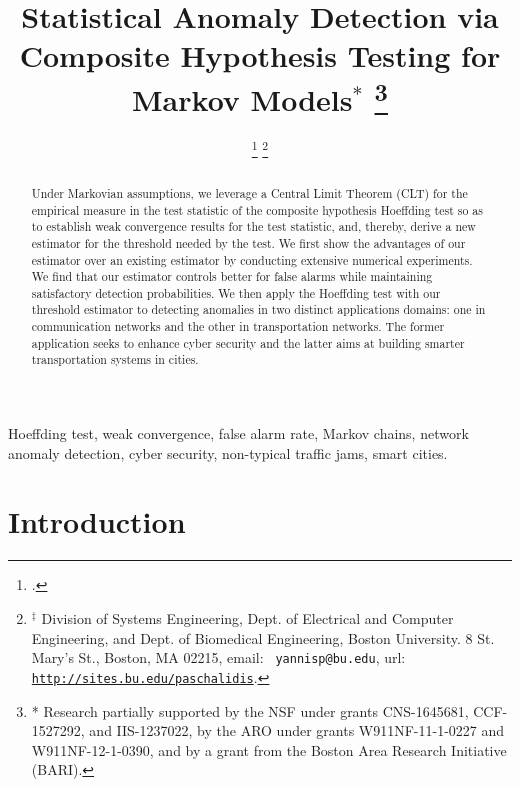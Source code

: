 \documentclass[10pt, twocolumn]{IEEEtran}
\begin{document}
\title{Statistical Anomaly Detection via Composite Hypothesis Testing
  for Markov Models$^*$ \thanks{* Research partially supported by the
    NSF under grants CNS-1645681, CCF-1527292, and IIS-1237022, by the
    ARO under grants W911NF-11-1-0227 and W911NF-12-1-0390, and by a
    grant from the Boston Area Research Initiative (BARI).}}

\author{ 
\thanks{.}
\thanks{$^\ddag$ Division of Systems Engineering, Dept. of Electrical
  and Computer Engineering, and Dept. of Biomedical Engineering, 
Boston University. 8 St. Mary's St., Boston, MA 02215, email: {\tt
 yannisp@bu.edu}, url: {\tt \url{http://sites.bu.edu/paschalidis}}.}
}


\maketitle
\begin{abstract}
  Under Markovian assumptions, we leverage a Central Limit Theorem (CLT)
  for the empirical measure in the test statistic of the composite
  hypothesis Hoeffding test so as to establish weak convergence results
  for the test statistic, and, thereby, derive a new estimator for the
  threshold needed by the test. We first show the advantages of our
  estimator over {an existing estimator} by conducting extensive
  numerical experiments. We find that our estimator controls better for
  false alarms while maintaining satisfactory detection
  probabilities. We then apply the Hoeffding test with our threshold
  estimator to detecting anomalies in two distinct applications domains:
  one in communication networks and the other in transportation
  networks. The former application seeks to enhance cyber security and
  the latter aims at building smarter transportation systems in cities.
\end{abstract}


\begin{IEEEkeywords}
  Hoeffding test, weak convergence, false alarm rate, Markov chains,
  network anomaly detection, cyber security, non-typical traffic jams, smart cities.
\end{IEEEkeywords}

\section{Introduction}
\end{document}
